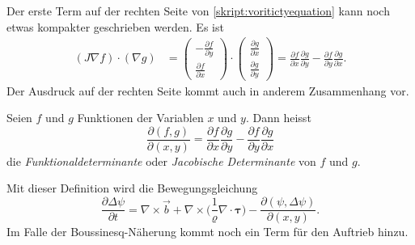 Der erste Term auf der rechten Seite von \eqref{skript:voritictyequation}
kann noch etwas kompakter geschrieben werden.
Es ist
\begin{align*}
(J\nabla f)\cdot(\nabla g)
&=
\begin{pmatrix}
-\frac{\partial f}{\partial y}
\\
\frac{\partial f}{\partial x}
\end{pmatrix}
\cdot
\begin{pmatrix}
\frac{\partial g}{\partial x}\\
\frac{\partial g}{\partial y}
\end{pmatrix}
=
\frac{\partial f}{\partial x}
\frac{\partial g}{\partial y}
-\frac{\partial f}{\partial y}
\frac{\partial g}{\partial x}.
\end{align*}
Der Ausdruck auf der rechten Seite kommt auch in anderem Zusammenhang vor.

\begin{definition}
Seien $f$ und $g$ Funktionen der Variablen $x$ und $y$.
Dann heisst
\[
\frac{\partial(f,g)}{\partial(x,y)}
=
\frac{\partial f}{\partial x}
\frac{\partial g}{\partial y}
-
\frac{\partial f}{\partial y}
\frac{\partial g}{\partial x}
\]
die
{\em Funktionaldeterminante} oder {\em Jacobische Determinante} von
$f$ und $g$.
\end{definition}
Mit dieser Definition wird die Bewegungsgleichung
\begin{equation}
\frac{\partial \Delta \psi}{\partial t}
=
\nabla\times\vec b
+ \nabla\times\biggl(\frac1{\varrho}\nabla\cdot\bm{\tau}\biggr)
-\frac{\partial(\psi,\Delta\psi)}{\partial(x,y)}.
\label{skript:psidgl}
\end{equation}
Im Falle der Boussinesq-Näherung kommt noch ein Term für den
Auftrieb hinzu.

